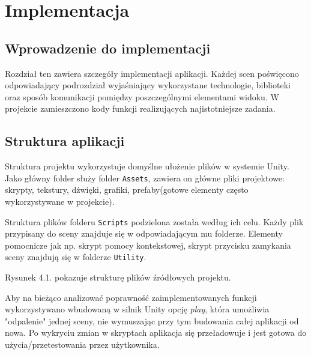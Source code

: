 \chapter{Implementacja}

\section{Wprowadzenie do implementacji}


Rozdział ten zawiera szczegóły implementacji aplikacji. Każdej scen poświęcono odpowiadający podrozdział wyjaśniający wykorzystane technologie, biblioteki oraz sposób komunikacji pomiędzy poszczególnymi elementami widoku. W projekcie zamieszczono kody funkcji realizujących najistotniejsze zadania.

\section{Struktura aplikacji}
Struktura projektu wykorzystuje domyślne ułożenie plików w systemie Unity. Jako główny folder służy folder \texttt{Assets}, zawiera on główne pliki projektowe: skrypty, tekstury, dźwięki, grafiki, prefaby(gotowe elementy często wykorzystywane w projekcie).

Struktura plików folderu \texttt{Scripts} podzielona została według ich celu. Każdy plik przypisany do sceny znajduje się w odpowiadającym mu folderze. Elementy pomocnicze jak np. skrypt pomocy kontekstowej, skrypt przycisku zamykania sceny znajdują się w folderze \texttt{Utility}.

Rysunek 4.1. pokazuje strukturę plików źródłowych projektu.

Aby na bieżąco analizować poprawność zaimplementowanych funkcji wykorzystywano wbudowaną w silnik Unity opcję \emph{play}, która umożliwia "odpalenie" jednej sceny, nie wymuszając przy tym budowania całej aplikacji od nowa. Po wykryciu zmian w skryptach aplikacja się przeładowuje i jest gotowa do użycia/przetestowania przez użytkownika.

